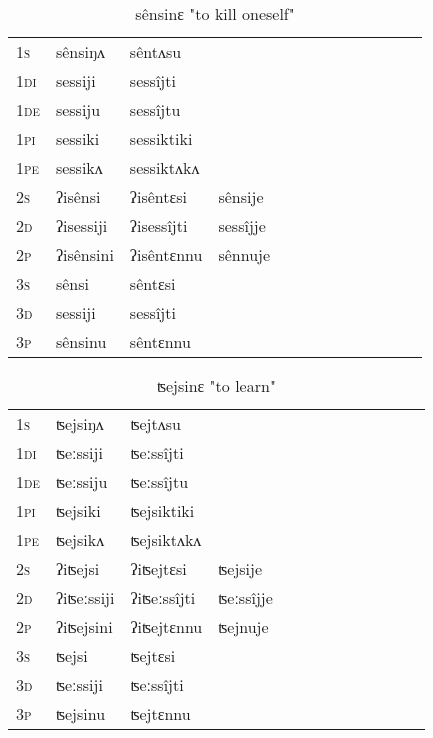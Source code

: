 \documentclass[oldfontcommands,oneside,a4paper,11pt]{article}
\begin{document}
\begin{table}[H]
\label{et.vr} \centering 
\caption{sênsinɛ  "to kill oneself"  }
\begin{tabular}{l|l|l|l|l|l|l|l|l|l|l|l|l}  \toprule
\textsc{1s} &sênsiŋʌ &sêntʌsu \\ 
\textsc{1di} &sessiji &sessîjti   \\
\textsc{1de} &sessiju &sessîjtu   \\ 
\textsc{1pi} &sessiki &sessiktiki   \\ 
\textsc{1pe} &sessikʌ &sessiktʌkʌ   \\ 
\textsc{2s} & ʔisênsi & ʔisêntɛsi &sênsije  \\ 
\textsc{2d} & ʔisessiji & ʔisessîjti &sessîjje    \\
\textsc{2p} & ʔisênsini  & ʔisêntɛnnu &sênnuje  \\ 
\textsc{3s} & sênsi & sêntɛsi   \\ 
\textsc{3d} & sessiji & sessîjti   \\ 
\textsc{3p} & sênsinu  & sêntɛnnu \\ 
\bottomrule
\end{tabular}
\end{table}


\begin{table}[H]
\label{en.vr} \centering 
\caption{ʦejsinɛ  "to learn"  }
\begin{tabular}{l|l|l|l|l|l|l|l|l|l|l|l|l}  \toprule
\textsc{1s} &ʦejsiŋʌ &ʦejtʌsu \\ 
\textsc{1di} &ʦeːssiji &ʦeːssîjti   \\
\textsc{1de} &ʦeːssiju &ʦeːssîjtu   \\ 
\textsc{1pi} &ʦejsiki &ʦejsiktiki   \\ 
\textsc{1pe} &ʦejsikʌ &ʦejsiktʌkʌ   \\ 
\textsc{2s} & ʔiʦejsi & ʔiʦejtɛsi &ʦejsije  \\ 
\textsc{2d} & ʔiʦeːssiji & ʔiʦeːssîjti &ʦeːssîjje    \\
\textsc{2p} & ʔiʦejsini  & ʔiʦejtɛnnu &ʦejnuje  \\ 
\textsc{3s} & ʦejsi & ʦejtɛsi   \\ 
\textsc{3d} & ʦeːssiji & ʦeːssîjti   \\ 
\textsc{3p} & ʦejsinu  & ʦejtɛnnu \\ 
\bottomrule
\end{tabular}
\end{table}
\end{document}
